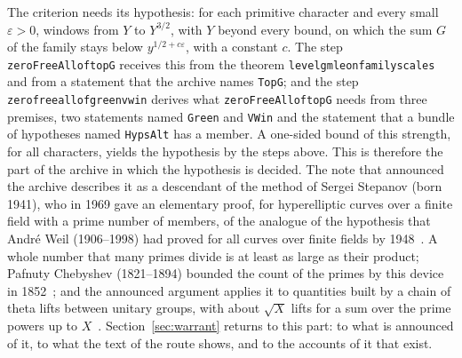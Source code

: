 \documentclass[11pt]{article}
\theoremstyle{definition}
\theoremstyle{remark}
\DeclareRobustCommand{\lean}[1]{{\renewcommand{\_}{\textunderscore\allowbreak}\texttt{#1}}}
\begin{document}
The criterion needs its hypothesis: for each primitive character and every small $\varepsilon>0$, windows from $Y$ to $Y^{3/2}$, with $Y$ beyond every bound, on which the sum $G$ of the family stays below $y^{1/2+c\varepsilon}$, with a constant $c$. The step \lean{zeroFreeAll\_of\_topG} receives this from the theorem \lean{level\_gm\_le\_on\_family\_scales} and from a statement that the archive names \lean{TopG}; and the step \lean{zero\_free\_all\_of\_green\_v\_win} derives what \lean{zeroFreeAll\_of\_topG} needs from three premises, two statements named \lean{Green} and \lean{VWin} and the statement that a bundle of hypotheses named \lean{HypsAlt} has a member. A one-sided bound of this strength, for all characters, yields the hypothesis by the steps above. This is therefore the part of the archive in which the hypothesis is decided. The note that announced the archive describes it as a descendant of the method of Sergei Stepanov (born 1941), who in 1969 gave an elementary proof, for hyperelliptic curves over a finite field with a prime number of members, of the analogue of the hypothesis that Andr\'e Weil (1906--1998) had proved for all curves over finite fields by 1948~\citep{alpoge,stepanov69,weil48}. A whole number that many primes divide is at least as large as their product; Pafnuty Chebyshev (1821--1894) bounded the count of the primes by this device in 1852~\citep{chebyshev52}; and the announced argument applies it to quantities built by a chain of theta lifts between unitary groups, with about $\sqrt X$ lifts for a sum over the prime powers up to $X$~\citep{alpoge,zhang}. Section~\ref{sec:warrant} returns to this part: to what is announced of it, to what the text of the route shows, and to the accounts of it that exist.
\end{document}
